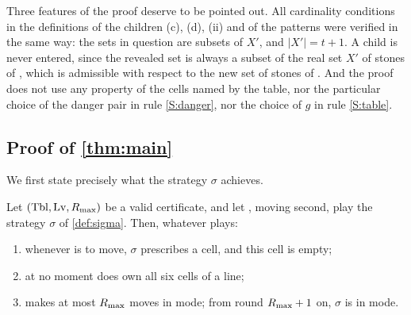 Three features of the proof deserve to be pointed out. All cardinality conditions in the definitions of the
children \textup{(c)}, \textup{(d)}, \textup{(ii)} and of the patterns were verified in the same way: the
sets in question are subsets of $X'$, and $|X'|=t+1$. A \VOID{} child is never entered, since the revealed set
is always a subset of the real set $X'$ of stones of \Maker, which is admissible with respect to the new set
of stones of \Breaker. And the proof does not use any property of the cells named by the table, nor the
particular choice of the danger pair in rule \ref{S:danger}, nor the choice of $g$ in rule \ref{S:table}.

\subsection{Proof of \texorpdfstring{\cref{thm:main}}{the main theorem}}\label{thm:main-proof}

We first state precisely what the strategy $\sigma$ achieves.

\begin{theorem}\label{thm:sigma}
Let $(\mathrm{Tbl},\mathrm{Lv},R_{\max})$ be a valid certificate, and let \Breaker, moving second, play the strategy $\sigma$ of
\cref{def:sigma}. Then, whatever \Maker{} plays:
\begin{enumerate}[label=\textup{(\alph*)},leftmargin=2.4em]
\item whenever \Breaker{} is to move, $\sigma$ prescribes a cell, and this cell is empty;
\item at no moment does \Maker{} own all six cells of a line;
\item \Breaker{} makes at most $R_{\max}$ moves in \TABLE{} mode; from round $R_{\max}+1$ on, $\sigma$ is in
  \PAIRING{} mode.
\end{enumerate}
\end{theorem}

